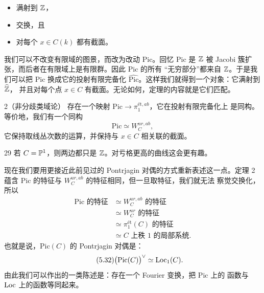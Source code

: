 \begin{itemize}
\item 满射到 $\mathbb{Z}$，
\item 交换，且
\item 对每个 $x\in C(k)$ 都有截面。
\end{itemize}

我们可以不改变有限域的图景，而改为改动 $\mathrm{Pic}$。回忆 $\mathrm{Pic}$ 是
$\mathbb{Z}$ 被 Jacobi 簇扩张，而后者在有限域上是有限群。因此 $\mathrm{Pic}$ 的所有
“无穷部分”都来自 $\mathbb{Z}$。于是我们可以把 $\mathrm{Pic}$ 换成它的投射有限完备化
$\widehat{\mathrm{Pic}}$。这样我们就得到一个对象：它满射到 $\widehat{\mathbb{Z}}$，
并且对每个点 $x\in C$ 有截面。无论如何，定理的内容就是它们匹配。

\begin{srcthm}{2}（非分歧类域论）
存在一个映射 $\mathrm{Pic}\to\pi_{1}^{\text{ét},ab}$，它在投射有限完备化上
是同构。等价地，我们有一个同构
\begin{equation}\tag{5.27}
\mathrm{Pic}\simeq W_{C}^{ur,ab},
\end{equation}
它保持取线丛次数的运算，并保持与 $x\in C$ 相关联的截面。
\end{srcthm}


\begin{srcex}{29}
若 $C=\mathbb{P}^{1}$，则两边都只是 $\mathbb{Z}$。对亏格更高的曲线这会更有趣。
\end{srcex}

现在我们要用更接近此前见过的 Pontrjagin 对偶的方式重新表述这一点。定理 2 蕴含
$\mathrm{Pic}$ 的特征与 $W_{C}^{ur,ab}$ 的特征相同，但一旦取特征，我们就无法
察觉交换化，所以
\begin{align}
\text{$\mathrm{Pic}$ 的特征}&\simeq\text{$W_{C}^{ur,ab}$ 的特征}\tag{5.28}\\
&\simeq\text{$W_{C}^{ur}$ 的特征}\tag{5.29}\\
&\simeq\text{$\pi_{1}^{\text{ét}}(C)$ 的特征}\tag{5.30}\\
&\simeq\text{$C$ 上秩 1 的局部系统}.\tag{5.31}
\end{align}
也就是说，$\mathrm{Pic}(C)$ 的 Pontrjagin 对偶是：
\begin{equation}\tag{5.32}
\bigl(\mathrm{Pic}(C)\bigr)^{\vee}\simeq\mathrm{Loc}_{1}(C).
\end{equation}
由此我们可以作出的一类陈述是：存在一个 Fourier 变换，把 $\mathrm{Pic}$ 上的
函数与 $\mathrm{Loc}$ 上的函数等同起来。

